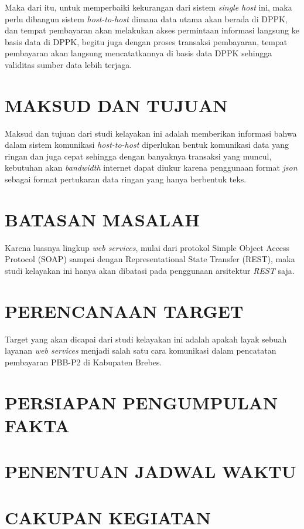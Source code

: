 \documentclass[pdftex, 12pt, oneside]{article}
\begin{document}
Maka dari itu, untuk memperbaiki kekurangan dari sistem \textit{single host} ini, maka perlu dibangun sistem \textit{host-to-host} dimana data utama akan berada di DPPK, dan tempat pembayaran akan melakukan akses permintaan informasi langsung ke basis data di DPPK, begitu juga dengan proses transaksi pembayaran, tempat pembayaran akan langsung mencatatkannya di basis data DPPK sehingga validitas sumber data lebih terjaga.

\section{MAKSUD DAN TUJUAN}

Maksud dan tujuan dari studi kelayakan ini adalah memberikan informasi bahwa dalam sistem komunikasi \textit{host-to-host} diperlukan bentuk komunikasi data yang ringan dan juga cepat sehingga dengan banyaknya transaksi yang muncul, kebutuhan akan \textit{bandwidth} internet dapat diukur karena penggunaan format \textit{json} sebagai format pertukaran data ringan yang hanya berbentuk teks.

\section{BATASAN MASALAH}

Karena luasnya lingkup \textit{web services}, mulai dari protokol Simple Object Access Protocol (SOAP) sampai dengan Representational State Transfer (REST), maka studi kelayakan ini hanya akan dibatasi pada penggunaan arsitektur \textit{REST} saja.

\section{PERENCANAAN TARGET}

Target yang akan dicapai dari studi kelayakan ini adalah apakah layak sebuah layanan \textit{web services} menjadi salah satu cara komunikasi dalam pencatatan pembayaran PBB-P2 di Kabupaten Brebes.

\section{PERSIAPAN PENGUMPULAN FAKTA}

\section{PENENTUAN JADWAL WAKTU}

\section{CAKUPAN KEGIATAN}
\end{document}
